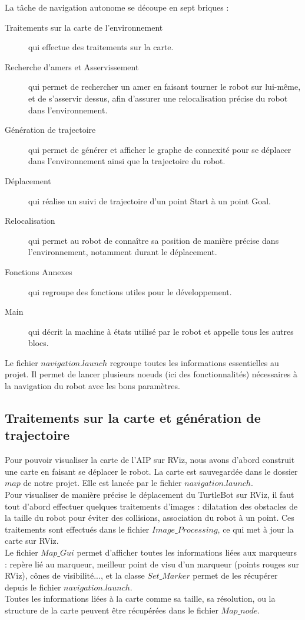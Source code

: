 \documentclass[10pt,a4paper]{article}
\begin{document}
La tâche de navigation autonome se découpe en sept briques : 
\begin{description}
\item [Traitements sur la carte de l'environnement] qui effectue des traitements sur la carte.
\item [Recherche d'amers et Asservissement] qui permet de rechercher un amer en faisant tourner le robot sur lui-même, et de s'asservir dessus, afin d'assurer une relocalisation précise du robot dans l'environnement.
\item [Génération de trajectoire] qui permet de générer et afficher le graphe de connexité pour se déplacer dans l'environnement ainsi que la trajectoire du robot.
\item [Déplacement] qui réalise un suivi de trajectoire d'un point Start à un point Goal.
\item [Relocalisation] qui permet au robot de connaître sa position de manière précise dans l'environnement, notamment durant le déplacement.
\item [Fonctions Annexes] qui regroupe des fonctions utiles pour le développement.
\item [Main] qui décrit la machine à états utilisé par le robot et appelle tous les autres blocs.
\end{description}


Le fichier $navigation.launch$ regroupe toutes les informations essentielles au projet. Il permet de lancer plusieurs noeuds (ici des fonctionnalités) nécessaires à la navigation du robot avec les bons paramètres.


\subsection{Traitements sur la carte et génération de trajectoire}
\label{sec:traitements}

Pour pouvoir visualiser la carte de l'AIP sur RViz, nous avons d'abord construit une carte en faisant se déplacer le robot. La carte est sauvegardée dans le dossier $map$ de notre projet. Elle est lancée par le fichier $navigation.launch$.\\
Pour visualiser de manière précise le déplacement du TurtleBot sur RViz, il faut tout d'abord effectuer quelques traitements d'images : dilatation des obstacles de la taille du robot pour éviter des collisions, association du robot à un point. Ces traitements sont effectués dans le fichier $Image\_Processing$, ce qui met à jour la carte sur RViz.\\
Le fichier $Map\_Gui$ permet d'afficher toutes les informations liées aux marqueurs : repère lié au marqueur, meilleur point de visu d'un marqueur (points rouges sur RViz), cônes de visibilité..., et la classe $Set\_Marker$ permet de les récupérer depuis le fichier $navigation.launch$.\\
Toutes les informations liées à la carte comme sa taille, sa résolution, ou la structure de la carte peuvent être récupérées dans le fichier $Map\_node$.\\\\
\end{document}
